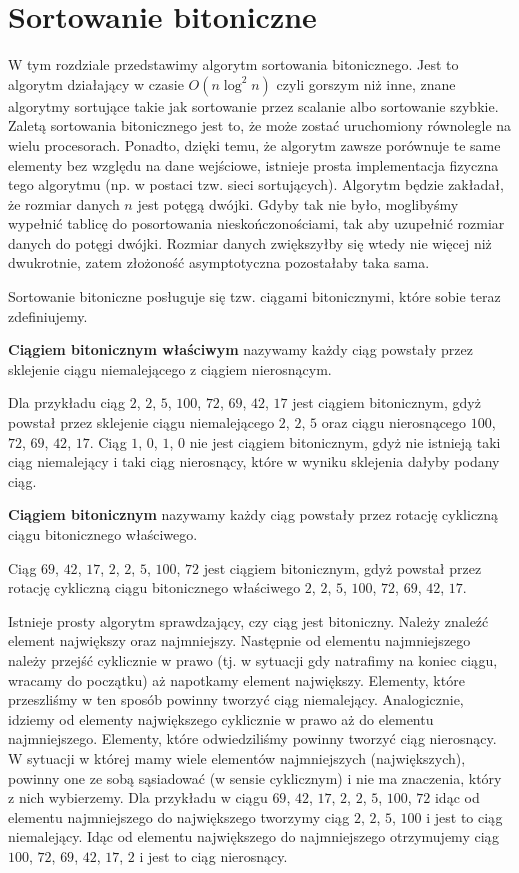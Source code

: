 \section{Sortowanie bitoniczne}

W tym rozdziale przedstawimy algorytm sortowania bitonicznego.
Jest to algorytm działający w czasie $O(n \log^2 n)$ czyli gorszym niż inne, znane algorytmy sortujące takie jak sortowanie przez scalanie albo sortowanie szybkie.
Zaletą sortowania bitonicznego jest to, że może zostać uruchomiony równolegle na wielu procesorach.
Ponadto, dzięki temu, że algorytm zawsze porównuje te same elementy bez względu na dane wejściowe, istnieje prosta implementacja fizyczna tego algorytmu (np. w postaci tzw. sieci sortujących).
Algorytm będzie zakładał, że rozmiar danych $n$ jest potęgą dwójki.
Gdyby tak nie było, moglibyśmy wypełnić tablicę do posortowania nieskończonościami, tak aby uzupełnić rozmiar danych do potęgi dwójki.
Rozmiar danych zwiększyłby się wtedy nie więcej niż dwukrotnie, zatem złożoność asymptotyczna pozostałaby taka sama.

Sortowanie bitoniczne posługuje się tzw. ciągami bitonicznymi, które sobie teraz zdefiniujemy.
\begin{definition}
 \textbf{Ciągiem bitonicznym właściwym} nazywamy każdy ciąg powstały przez sklejenie ciągu niemalejącego z ciągiem nierosnącym.
\end{definition}
Dla przykładu ciąg $2$, $2$, $5$, $100$, $72$, $69$, $42$, $17$ jest ciągiem bitonicznym, gdyż powstał przez sklejenie ciągu niemalejącego $2$, $2$, $5$ oraz ciągu nierosnącego $100$, $72$, $69$, $42$, $17$.
Ciąg $1$, $0$, $1$, $0$ nie jest ciągiem bitonicznym, gdyż nie istnieją taki ciąg niemalejący i taki ciąg nierosnący, które w wyniku sklejenia dałyby podany ciąg.
\begin{definition}
 \textbf{Ciągiem bitonicznym} nazywamy każdy ciąg powstały przez rotację cykliczną ciągu bitonicznego właściwego.
\end{definition}
Ciąg $69$, $42$, $17$, $2$, $2$, $5$, $100$, $72$ jest ciągiem bitonicznym, gdyż powstał przez rotację cykliczną ciągu bitonicznego właściwego $2$, $2$, $5$, $100$, $72$, $69$, $42$, $17$.

Istnieje prosty algorytm sprawdzający, czy ciąg jest bitoniczny.
Należy znaleźć element największy oraz najmniejszy.
Następnie od elementu najmniejszego należy przejść cyklicznie w prawo (tj. w sytuacji gdy natrafimy na koniec ciągu, wracamy do początku) aż napotkamy element największy.
Elementy, które przeszliśmy w ten sposób powinny tworzyć ciąg niemalejący.
Analogicznie, idziemy od elementy największego cyklicznie w prawo aż do elementu najmniejszego.
Elementy, które odwiedziliśmy powinny tworzyć ciąg nierosnący.
W sytuacji w której mamy wiele elementów najmniejszych (największych), powinny one ze sobą sąsiadować (w sensie cyklicznym) i nie ma znaczenia, który z nich wybierzemy.
Dla przykładu w ciągu  $69$, $42$, $17$, $2$, $2$, $5$, $100$, $72$ idąc od elementu najmniejszego do największego tworzymy ciąg $2$, $2$, $5$, $100$ i jest to ciąg niemalejący.
Idąc od elementu największego do najmniejszego otrzymujemy ciąg $100$, $72$, $69$, $42$, $17$, $2$ i jest to ciąg nierosnący.

